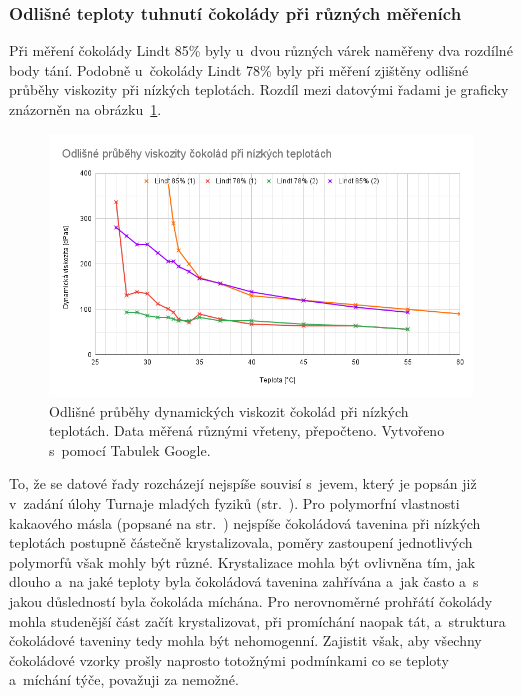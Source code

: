 \documentclass[12pt]{article}
\begin{document}
\subsubsection{Odlišné teploty tuhnutí čokolády při různých měřeních}%

Při měření čokolády Lindt 85\% byly u~dvou různých várek naměřeny dva rozdílné body tání. Podobně u~čokolády Lindt 78\% byly při měření zjištěny odlišné průběhy viskozity při nízkých teplotách. Rozdíl mezi datovými řadami je graficky znázorněn na obrázku~\ref{fig:coko_nizke_teploty}.

\begin{figure}
    \centering
    \includegraphics[width = \linewidth]{figures/coko_nizke_teploty.png}
    \caption{Odlišné průběhy dynamických viskozit čokolád při nízkých teplotách. Data měřená různými vřeteny, přepočteno. Vytvořeno s~pomocí Tabulek Google.}
    \label{fig:coko_nizke_teploty}
\end{figure}
\par\noindent

To, že se datové řady rozcházejí nejspíše souvisí s~jevem, který je popsán již v~zadání úlohy Turnaje mladých fyziků (str.~\pageref{sec:zadani_tmf}). Pro polymorfní vlastnosti kakaového másla (popsané na str.~\pageref{sec:polymorfie}) nejspíše čokoládová tavenina při nízkých teplotách postupně částečně krystalizovala, poměry zastoupení jednotlivých polymorfů však mohly být různé. Krystalizace mohla být ovlivněna tím, jak dlouho a~na jaké teploty byla čokoládová tavenina zahřívána a~jak často a~s jakou důsledností byla čokoláda míchána. Pro nerovnoměrné prohřátí čokolády mohla studenější část začít krystalizovat, při promíchání naopak tát, a~struktura čokoládové taveniny tedy mohla být nehomogenní. Zajistit však, aby všechny čokoládové vzorky prošly naprosto totožnými podmínkami co se teploty a~míchání týče, považuji za nemožné.
\end{document}
